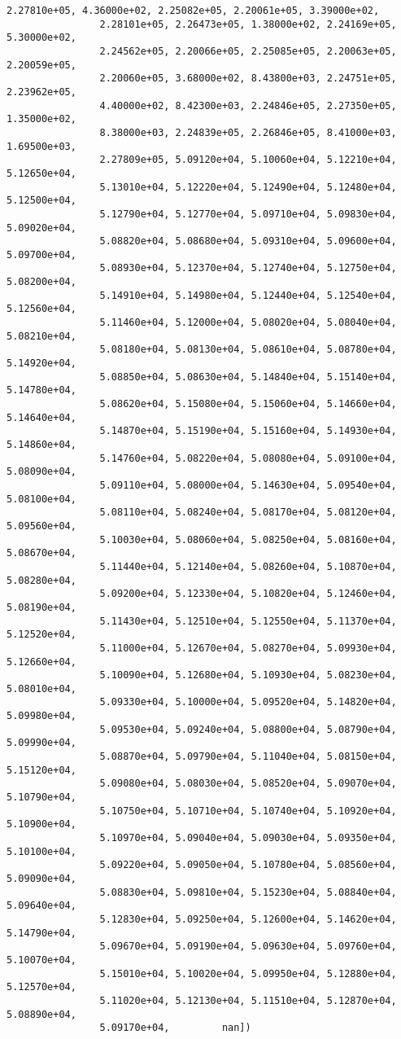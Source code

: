 \documentclass[11pt]{article}
\begin{document}
\begin{Verbatim}[commandchars=\\\{\}]
                2.27810e+05, 4.36000e+02, 2.25082e+05, 2.20061e+05, 3.39000e+02,
                2.28101e+05, 2.26473e+05, 1.38000e+02, 2.24169e+05, 5.30000e+02,
                2.24562e+05, 2.20066e+05, 2.25085e+05, 2.20063e+05, 2.20059e+05,
                2.20060e+05, 3.68000e+02, 8.43800e+03, 2.24751e+05, 2.23962e+05,
                4.40000e+02, 8.42300e+03, 2.24846e+05, 2.27350e+05, 1.35000e+02,
                8.38000e+03, 2.24839e+05, 2.26846e+05, 8.41000e+03, 1.69500e+03,
                2.27809e+05, 5.09120e+04, 5.10060e+04, 5.12210e+04, 5.12650e+04,
                5.13010e+04, 5.12220e+04, 5.12490e+04, 5.12480e+04, 5.12500e+04,
                5.12790e+04, 5.12770e+04, 5.09710e+04, 5.09830e+04, 5.09020e+04,
                5.08820e+04, 5.08680e+04, 5.09310e+04, 5.09600e+04, 5.09700e+04,
                5.08930e+04, 5.12370e+04, 5.12740e+04, 5.12750e+04, 5.08200e+04,
                5.14910e+04, 5.14980e+04, 5.12440e+04, 5.12540e+04, 5.12560e+04,
                5.11460e+04, 5.12000e+04, 5.08020e+04, 5.08040e+04, 5.08210e+04,
                5.08180e+04, 5.08130e+04, 5.08610e+04, 5.08780e+04, 5.14920e+04,
                5.08850e+04, 5.08630e+04, 5.14840e+04, 5.15140e+04, 5.14780e+04,
                5.08620e+04, 5.15080e+04, 5.15060e+04, 5.14660e+04, 5.14640e+04,
                5.14870e+04, 5.15190e+04, 5.15160e+04, 5.14930e+04, 5.14860e+04,
                5.14760e+04, 5.08220e+04, 5.08080e+04, 5.09100e+04, 5.08090e+04,
                5.09110e+04, 5.08000e+04, 5.14630e+04, 5.09540e+04, 5.08100e+04,
                5.08110e+04, 5.08240e+04, 5.08170e+04, 5.08120e+04, 5.09560e+04,
                5.10030e+04, 5.08060e+04, 5.08250e+04, 5.08160e+04, 5.08670e+04,
                5.11440e+04, 5.12140e+04, 5.08260e+04, 5.10870e+04, 5.08280e+04,
                5.09200e+04, 5.12330e+04, 5.10820e+04, 5.12460e+04, 5.08190e+04,
                5.11430e+04, 5.12510e+04, 5.12550e+04, 5.11370e+04, 5.12520e+04,
                5.11000e+04, 5.12670e+04, 5.08270e+04, 5.09930e+04, 5.12660e+04,
                5.10090e+04, 5.12680e+04, 5.10930e+04, 5.08230e+04, 5.08010e+04,
                5.09330e+04, 5.10000e+04, 5.09520e+04, 5.14820e+04, 5.09980e+04,
                5.09530e+04, 5.09240e+04, 5.08800e+04, 5.08790e+04, 5.09990e+04,
                5.08870e+04, 5.09790e+04, 5.11040e+04, 5.08150e+04, 5.15120e+04,
                5.09080e+04, 5.08030e+04, 5.08520e+04, 5.09070e+04, 5.10790e+04,
                5.10750e+04, 5.10710e+04, 5.10740e+04, 5.10920e+04, 5.10900e+04,
                5.10970e+04, 5.09040e+04, 5.09030e+04, 5.09350e+04, 5.10100e+04,
                5.09220e+04, 5.09050e+04, 5.10780e+04, 5.08560e+04, 5.09090e+04,
                5.08830e+04, 5.09810e+04, 5.15230e+04, 5.08840e+04, 5.09640e+04,
                5.12830e+04, 5.09250e+04, 5.12600e+04, 5.14620e+04, 5.14790e+04,
                5.09670e+04, 5.09190e+04, 5.09630e+04, 5.09760e+04, 5.10070e+04,
                5.15010e+04, 5.10020e+04, 5.09950e+04, 5.12880e+04, 5.12570e+04,
                5.11020e+04, 5.12130e+04, 5.11510e+04, 5.12870e+04, 5.08890e+04,
                5.09170e+04,         nan])
\end{Verbatim}
            
\end{document}
